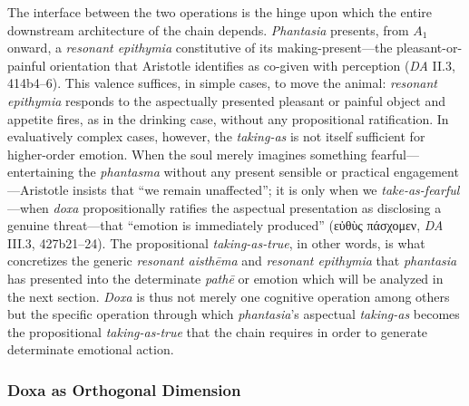 \documentclass{article}
\newcommand{\gk}[1]{{\greekfont #1}}
\begin{document}
The interface between the two operations is the hinge upon which the entire downstream architecture of the chain depends. \textit{Phantasia} presents, from $A_1$ onward, a \textit{resonant epithymia} constitutive of its making-present---the pleasant-or-painful orientation that Aristotle identifies as co-given with perception (\textit{DA} II.3, 414b4--6). This valence suffices, in simple cases, to move the animal: \textit{resonant epithymia} responds to the aspectually presented pleasant or painful object and appetite fires, as in the drinking case, without any propositional ratification. In evaluatively complex cases, however, the \textit{taking-as} is not itself sufficient for higher-order emotion. When the soul merely imagines something fearful---entertaining the \textit{phantasma} without any present sensible or practical engagement---Aristotle insists that ``we remain unaffected''; it is only when we \textit{take-as-fearful}---when \textit{doxa} propositionally ratifies the aspectual presentation as disclosing a genuine threat---that ``emotion is immediately produced'' (\gk{εὐθὺς πάσχομεν}, \textit{DA} III.3, 427b21--24). The propositional \textit{taking-as-true}, in other words, is what concretizes the generic \textit{resonant aisthēma} and \textit{resonant epithymia} that \textit{phantasia} has presented into the determinate \textit{pathē} or emotion which will be analyzed in the next section. \textit{Doxa} is thus not merely one cognitive operation among others but the specific operation through which \textit{phantasia}'s aspectual \textit{taking-as} becomes the propositional \textit{taking-as-true} that the chain requires in order to generate determinate emotional action.

\subsubsection*{Doxa as Orthogonal Dimension}
\end{document}
